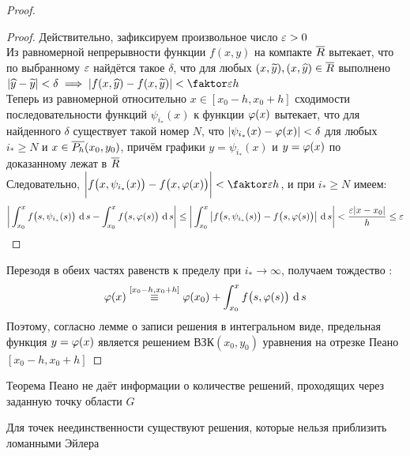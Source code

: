 \begin{proof}
\begin{statement}
    \end{statement}
    \begin{proof}
        Действительно, зафиксируем произвольное число $ \veps > 0 $ \\
        Из равномерной непрерывности функции $ f(x, y) $ на компакте $ \ol{R} $ вытекает, что по выбранному $ \veps $ найдётся такое $ \delta $, что для любых $ (x, \vawe{y}), (x, \hat{y}) \in \ol{R} $ выполнено $ |\hat{y} - \vawe{y}| < \delta \implies |f(x, \hat{y}) - f(x, \vawe{y})| < \faktor\veps{h} $ \\
        Теперь из равномерной относительно $ x \in [x_0 - h, x_0 + h] $ сходимости последовательности функций $ \psi_{i_*}(x) $ к функции $ \vphi(x) $ вытекает, что для найденного $ \delta $ существует такой номер $ N $, что $ |\psi_{i_*}(x) - \vphi(x)| < \delta $ для любых $ i_* \ge N $ и $ x \in \ol{P_h}(x_0, y_0) $, причём графики $ y = \psi_{i_*}(x) $ и $ y = \vphi(x) $ по доказанному лежат в $ \ol{R} $ \\
        Следовательно, $ \bigg| f \big(x, \psi_{i_*}(x) \big) - f \big( x, \vphi(x) \big) \bigg| < \faktor\veps{h} $, и при $ i_* \ge N $ имеем:
        $$ \bigg| \dint[s]{x_0}x{f \big( s, \psi_{i_*}(s) \big)} - \dint[s]{x_0}x{f \big( s, \vphi(s) \big)} \bigg| \le \bigg| \dint[s]{x_0}x{\big| f \big(s, \psi_{i_*}(s) \big) - f \big( s, \vphi(s) \big) \big|} \bigg| < \frac{\veps|x - x_0|}h \le \veps $$
    \end{proof}
    Перезодя в обеих частях равенств  к пределу при $ i_* \to \infty $, получаем тождество :
    $$ \vphi(x) \overset{[x_0 - h, x_0 + h]}\equiv \vphi(x_0) + \dint[s]{x_0}x{f \big(s, \vphi(s) \big)} $$
    Поэтому, согласно лемме о записи решения в интегральном виде, предельная функция $ y = \vphi(x) $ является решением ВЗК$ (x_0, y_0) $ уравнения  на отрезке Пеано $ [x_0 - h, x_0 + h] $
\end{proof}

\begin{remark}
	Теорема Пеано не даёт информации о количестве решений, проходящих через заданную точку области $ G $
\end{remark}

\begin{remark}
	Для точек неединственности существуют решения, которые нельзя приблизить ломанными Эйлера
\end{remark}
